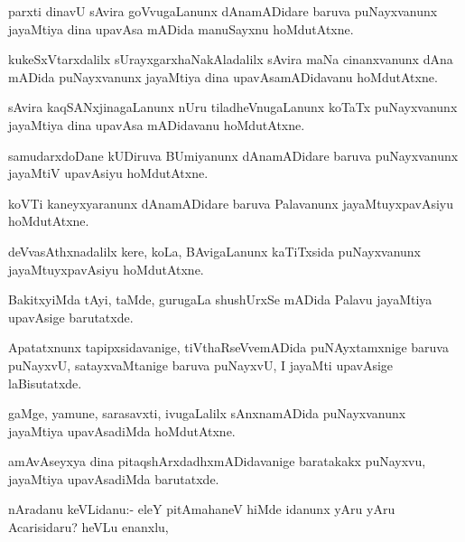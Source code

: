 \begin{mng}
parxti dinavU sAvira goVvugaLanunx dAnamADidare baruva puNayxvanunx jayaMtiya dina upavAsa mADida manuSayxnu hoMdutAtxne.
\end{mng}

\begin{mng}
kukeSxVtarxdalilx sUrayxgarxhaNakAladalilx sAvira maNa cinanxvanunx dAna mADida puNayxvanunx jayaMtiya dina upavAsamADidavanu hoMdutAtxne. 
\end{mng}

\begin{mng}
sAvira kaqSANxjinagaLanunx nUru tiladheVnugaLanunx koTaTx puNayxvanunx jayaMtiya dina upavAsa mADidavanu hoMdutAtxne.
\end{mng}

\begin{mng}
samudarxdoDane kUDiruva BUmiyanunx dAnamADidare baruva puNayxvanunx jayaMtiV upavAsiyu hoMdutAtxne.
\end{mng}

\begin{mng}
koVTi kaneyxyaranunx dAnamADidare baruva Palavanunx jayaMtuyxpavAsiyu hoMdutAtxne.
\end{mng}

\begin{mng}
deVvasAthxnadalilx kere, koLa, BAvigaLanunx kaTiTxsida puNayxvanunx jayaMtuyxpavAsiyu hoMdutAtxne.
\end{mng}

\begin{mng}
BakitxyiMda tAyi, taMde, gurugaLa shushUrxSe mADida Palavu jayaMtiya upavAsige barutatxde.
\end{mng}

\begin{mng}
Apatatxnunx tapipxsidavanige, tiVthaRseVvemADida puNAyxtamxnige baruva puNayxvU, satayxvaMtanige baruva puNayxvU, I jayaMti upavAsige laBisutatxde.
\end{mng}

\begin{mng}
gaMge, yamune, sarasavxti, ivugaLalilx sAnxnamADida puNayxvanunx jayaMtiya upavAsadiMda hoMdutAtxne.
\end{mng}

\begin{mng}
amAvAseyxya dina pitaqshArxdadhxmADidavanige baratakakx puNayxvu, jayaMtiya upavAsadiMda barutatxde. 
\end{mng}

\begin{mng}
nAradanu keVLidanu:- eleY pitAmahaneV hiMde idanunx yAru yAru Acarisidaru? heVLu enanxlu,
\end{mng}

